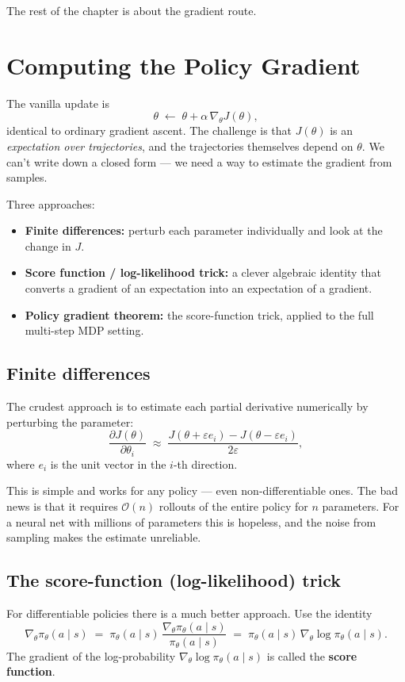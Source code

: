 \documentclass[11pt, oneside]{book}
\newcommand{\pd}[2]{\frac{\partial #1}{\partial #2}}
\newcommand{\bigO}[1]{\mathcal{O}\!\left(#1\right)}
\begin{document}
The rest of the chapter is about the gradient route.

\section{Computing the Policy Gradient}

The vanilla update is
\[
  \theta \;\leftarrow\; \theta + \alpha\, \nabla_\theta J(\theta),
\]
identical to ordinary gradient ascent.
The challenge is that $J(\theta)$ is an \emph{expectation over trajectories}, and the
trajectories themselves depend on $\theta$. We can't write down a closed form ---
we need a way to estimate the gradient from samples.

Three approaches:
\begin{itemize}
  \item \textbf{Finite differences:} perturb each parameter individually and look at
    the change in $J$.
  \item \textbf{Score function / log-likelihood trick:} a clever algebraic identity
    that converts a gradient of an expectation into an expectation of a gradient.
  \item \textbf{Policy gradient theorem:} the score-function trick, applied to the
    full multi-step MDP setting.
\end{itemize}

\subsection{Finite differences}

The crudest approach is to estimate each partial derivative numerically by perturbing
the parameter:
\[
  \pd{J(\theta)}{\theta_i} \;\approx\; \frac{J(\theta + \varepsilon e_i) - J(\theta - \varepsilon e_i)}{2\varepsilon},
\]
where $e_i$ is the unit vector in the $i$-th direction.

This is simple and works for any policy --- even non-differentiable ones.
The bad news is that it requires $\bigO{n}$ rollouts of the entire policy for $n$
parameters.
For a neural net with millions of parameters this is hopeless, and the noise from
sampling makes the estimate unreliable.

\subsection{The score-function (log-likelihood) trick}

For differentiable policies there is a much better approach. Use the identity
\[
  \nabla_\theta \pi_\theta(a \mid s)
  \;=\; \pi_\theta(a \mid s)\, \frac{\nabla_\theta \pi_\theta(a \mid s)}{\pi_\theta(a \mid s)}
  \;=\; \pi_\theta(a \mid s)\, \nabla_\theta \log \pi_\theta(a \mid s).
\]
The gradient of the log-probability $\nabla_\theta \log \pi_\theta(a \mid s)$ is called
the \textbf{score function}.
\end{document}
